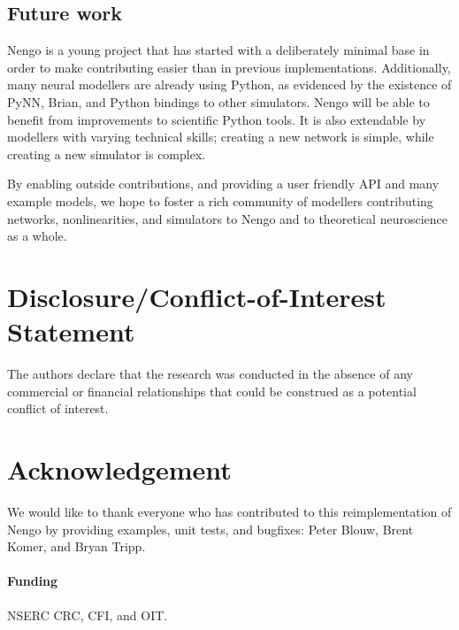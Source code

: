 \documentclass{frontiersSCNS}
\begin{document}
\subsection{Future work}

Nengo is a young project that
has started with a deliberately minimal base
in order to make contributing easier than in
previous implementations.
Additionally, many neural modellers
are already using Python,
as evidenced by the existence of
PyNN, Brian, and Python bindings to other simulators.
Nengo will be able to benefit
from improvements to scientific Python tools.
It is also extendable by modellers with
varying technical skills;
creating a new network is simple,
while creating a new simulator is complex.

By enabling outside contributions,
and providing a user friendly API
and many example models,
we hope to foster a rich community of modellers
contributing networks, nonlinearities,
and simulators to Nengo
and to theoretical neuroscience
as a whole.

\section*{Disclosure/Conflict-of-Interest Statement}

The authors declare that the research was conducted in the absence of
any commercial or financial relationships that could be construed as a
potential conflict of interest.

\section*{Acknowledgement}

We would like to thank
everyone who has contributed
to this reimplementation of Nengo
by providing examples,
unit tests, and bugfixes:
Peter Blouw, Brent Komer, and Bryan Tripp.

\paragraph{Funding\textcolon}
NSERC CRC, CFI, and OIT.



\end{document}
